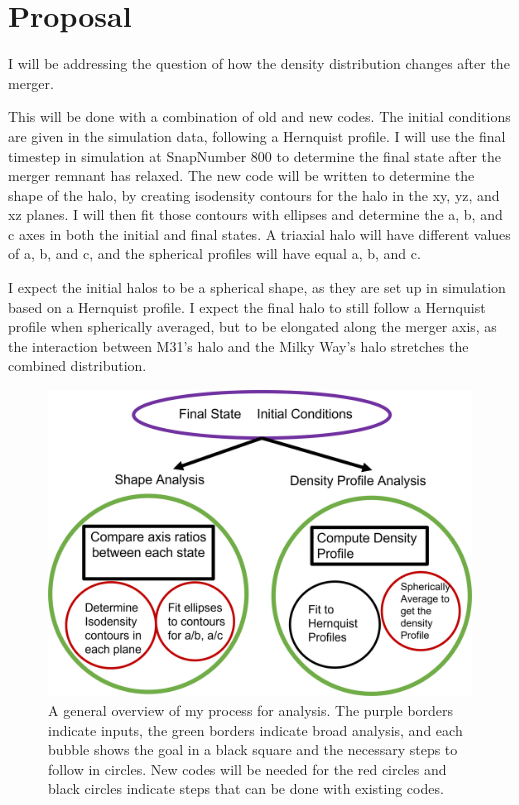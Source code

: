 \documentclass[linenumbers]{aastex631}
\begin{document}
\section{Proposal}

I will be addressing the question of how the density distribution changes after the merger. 

This will be done with a combination of old and new codes. The initial conditions are given in the simulation data, following a Hernquist profile. I will use the final timestep in simulation at SnapNumber 800 to determine the final state after the merger remnant has relaxed. The new code will be written to determine the shape of the halo, by creating isodensity contours for the halo in the xy, yz, and xz planes. I will then fit those contours with ellipses and determine the a, b, and c axes in both the initial and final states. A triaxial halo will have different values of a, b, and c, and the spherical profiles will have equal a, b, and c.

I expect the initial halos to be a spherical shape, as they are set up in simulation based on a Hernquist profile. I expect the final halo to still follow a Hernquist profile when spherically averaged, but to be elongated along the merger axis, as the interaction between M31's halo and the Milky Way's halo stretches the combined distribution.

\begin{figure}[h]
    \centering
    \includegraphics[width=\textwidth]{MethodsFlowchart400B.png}
    \caption{A general overview of my process for analysis. The purple borders indicate inputs, the green borders indicate broad analysis, and each bubble shows the goal in a black square and the necessary steps to follow in circles. New codes will be needed for the red circles and black circles indicate steps that can be done with existing codes.}
    \label{fig:2}
\end{figure}


\end{document}
